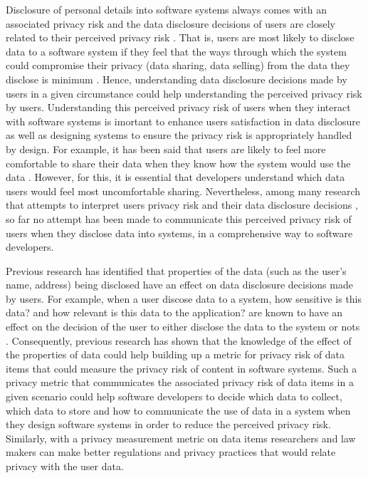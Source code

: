 \documentclass[conference]{IEEEtran}
\begin{document}
Disclosure of personal details into software systems always comes with an associated privacy risk  \cite {malhotra2004internet} and the data disclosure decisions of users are closely related to their perceived privacy risk \cite {li2010understanding}. That is, users are most likely to disclose data to a software system if they feel that the ways through which the system could compromise their privacy (data sharing, data selling) from the data they disclose is minimum  \cite {kobsa2007privacy}. Hence, understanding data disclosure decisions made by users in a given circumstance could help understanding the perceived privacy risk by users. Understanding this perceived privacy risk of users when they interact with software systems is imortant to enhance users satisfaction in data disclosure as well as designing systems to ensure the privacy risk is appropriately handled by design. For example, it has been said that users are likely to feel more comfortable to share their data when they know how the system would use the data \cite {knijnenburg2013helping}. However, for this, it is essential that developers understand which data users would feel most uncomfortable sharing. Nevertheless, among many research that attempts to interpret users privacy risk and their data disclosure decisions \cite {knijnenburg2013making}, so far no attempt has been made to communicate this perceived privacy risk of users when they disclose data into systems, in a comprehensive way to software developers.


Previous research has identified that properties of the data (such as the user's name, address) being disclosed have an effect on data disclosure decisions made by users. For example, when a user discose data to a system, how sensitive is this data? and how relevant is this data to the application? are known to have an effect on the decision of the user to either disclose the data to the system or nots \cite {malheiros2013fairly}. Consequently, previous research has shown that the knowledge of the effect of the properties of data could help building up a metric for privacy risk of data items \cite {maximilien2009privacy} that could measure the privacy risk of content in software systems. Such a privacy metric that communicates the associated privacy risk of data items in a given scenario could help software developers to decide which data to collect, which data to store and how to communicate the use of data in a system when they design software systems in order to reduce the perceived privacy risk. Similarly, with a privacy measurement metric on data items researchers and law makers can make better regulations and privacy practices that would relate privacy with the user data.
\end{document}
